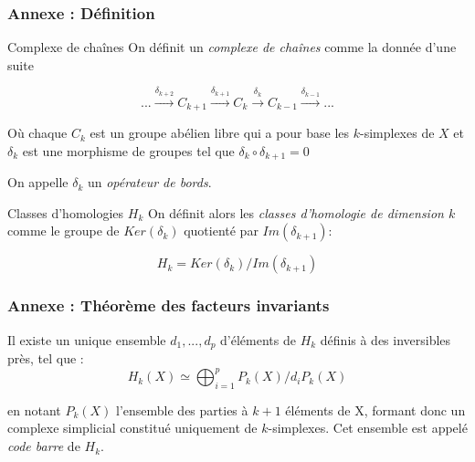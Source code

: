 \documentclass{beamer}
\begin{document}
\appendix

\begin{frame}
    \frametitle{Annexe : Définition}
    \begin{block}{Complexe de chaînes}
        On définit un \textit{complexe de chaînes} comme la donnée d'une suite 
    
        $$... \xrightarrow{\delta_{k+2}} C_{k+1} \xrightarrow{\delta_{k+1}} C_k \xrightarrow{\delta_k} C_{k-1} \xrightarrow{\delta_{k-1}} ...$$

        Où chaque $C_k$ est un groupe abélien libre qui a pour base les $k$-simplexes de $X$ et $\delta_k$ est une morphisme de groupes tel que $\delta_k \circ \delta_{k+1} = 0$
        
        On appelle $\delta_k$ un \textit{opérateur de bords}.

    \end{block}
    \begin{block}{Classes d'homologies $H_k$}
    On définit alors les \textit{classes d'homologie de dimension $k$} comme le groupe de $Ker(\delta_k)$ quotienté par $Im(\delta_{k+1})$:

    $$H_k = Ker(\delta_k) / Im(\delta_{k+1})$$
    \end{block}
\end{frame}

\begin{frame}
    \frametitle{Annexe : Théorème des facteurs invariants}
    Il existe un unique ensemble ${d_1, ..., d_p}$ d'éléments de $H_k$ définis à des inversibles près, tel que :
    $$H_k (X) \simeq \bigoplus_{i=1}^p P_k (X) / d_i P_k (X)$$

    en notant $P_k(X)$ l'ensemble des parties à $k+1$ éléments de X, formant donc un complexe simplicial constitué uniquement de $k$-simplexes. Cet ensemble est appelé \textit{code barre} de $H_k$.
\end{frame}
\end{document}
